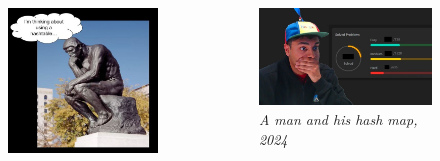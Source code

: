 \documentclass{beamer}
\begin{document}
\begin{frame}
	\begin{columns}
	\begin{figure}
		\centering
		\includegraphics[scale=0.5]{./pict/secret1.png}
	\end{figure}

	\begin{figure}
		\centering
		\includegraphics[scale=0.5]{pict/secret2.jpg}
		\caption{ \emph{A man and his hash map, 2024} }
	\end{figure}	
	\end{columns}
\end{frame}
\end{document}
